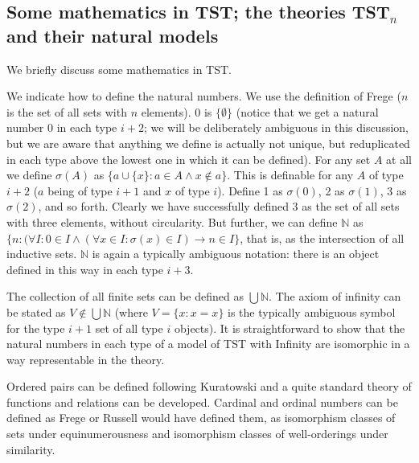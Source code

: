 \documentclass[112pt]{article}
\begin{document}
\newpage

\subsection{Some mathematics in TST;  the theories TST$_n$ and their natural models}

We briefly discuss some mathematics in TST.

We indicate how to define the natural numbers.  We use the definition of Frege ($n$ is the set of all sets with $n$ elements).  0 is $\{\emptyset\}$ (notice that we get a natural number 0 in each type $i+2$;  we will be deliberately ambiguous in this discussion, but we are aware that anything we define is actually not unique, but reduplicated in each type above the lowest one in which it can be defined).  For any set $A$ at all we define $\sigma(A)$ as $\{a \cup \{x\}:a \in A \wedge x \not\in a\}$.  This is definable for any $A$ of type $i+2$ ($a$ being of type $i+1$ and $x$ of type $i$).  Define 1 as $\sigma(0)$, 2 as $\sigma(1)$,  3 as $\sigma(2)$, and so forth.  Clearly we have successfully defined 3 as the set of all sets with three elements, without circularity.
But further, we can define $\mathbb N$ as $\{n:(\forall I:0 \in I \wedge (\forall x \in I:\sigma(x) \in I) \rightarrow n \in I\}$, that is, as the intersection of all inductive sets.
$\mathbb N$ is again a typically ambiguous notation:  there is an object defined in this way in each type $i+3$.

The collection of all finite sets can be defined as $\bigcup \mathbb N$.  The axiom of infinity can be stated as $V \not\in \bigcup \mathbb N$ (where $V= \{x:x=x\}$ is the typically ambiguous symbol for the type $i+1$ set of all type $i$ objects).  It is straightforward to show that the natural numbers in each type of a model of TST with Infinity are isomorphic in a way representable in the theory.

Ordered pairs can be defined following Kuratowski and a quite standard theory of functions and relations can be developed.  Cardinal and ordinal numbers can be defined as Frege or Russell would have defined them, as isomorphism classes of sets under equinumerousness and isomorphism classes of well-orderings under similarity.  
\end{document}
